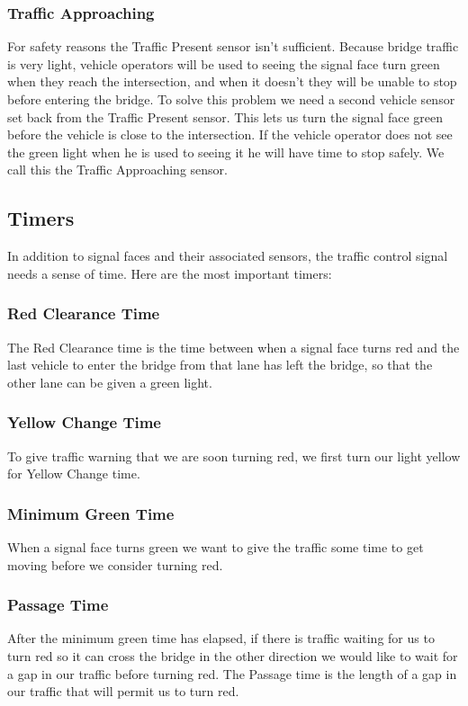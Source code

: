 \documentclass[letterpaper,twoside]{article}
\begin{document}
\subsubsection{Traffic Approaching}

For safety reasons the Traffic Present sensor isn't sufficient.
Because bridge traffic is very light, vehicle operators will be
used to seeing the signal face turn green when they reach
the intersection, and when it doesn't they will be unable to stop
before entering the bridge.  To solve this problem we need a
second vehicle sensor set back from the Traffic Present sensor.
This lets us turn the signal face green before the vehicle is
close to the intersection.  If the vehicle operator does not
see the green light when he is used to seeing it he will have
time to stop safely.  We call this the Traffic Approaching sensor.

\subsection{Timers}

In addition to signal faces and their associated sensors, the
traffic control signal needs a sense of time.  Here are the most
important timers:

\subsubsection{Red Clearance Time}
The Red Clearance time is the time between when a signal face turns red
and the last vehicle to enter the bridge from that lane has left the
bridge, so that the other lane can be given a green light.

\subsubsection{Yellow Change Time}
To give traffic warning that we are soon turning red, we first turn our light
yellow for Yellow Change time.

\subsubsection{Minimum Green Time}
When a signal face turns green we want to give the traffic some time
to get moving before we consider turning red.

\subsubsection{Passage Time}
After the minimum green time has elapsed, if there is traffic waiting for
us to turn red so it can cross the bridge in the other direction
we would like to wait for a gap in our traffic before turning red.
The Passage time is the length of a gap in our traffic that will permit us
to turn red.
\end{document}
